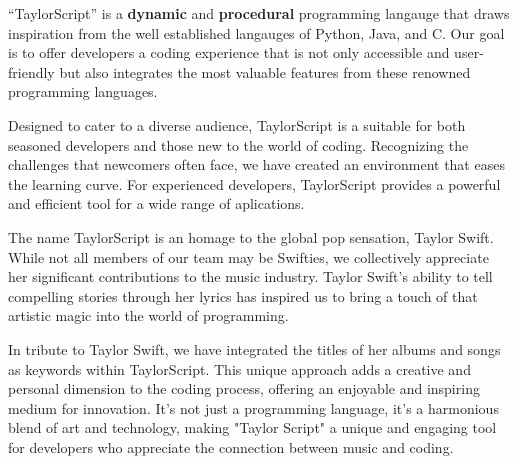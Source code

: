 ``TaylorScript'' is a \textbf{dynamic} and \textbf{procedural} programming langauge that draws inspiration from the well established langauges of Python, Java, and C. Our goal is to offer developers a coding experience that is not only accessible and user-friendly but also integrates the most valuable features from these renowned programming languages.

Designed to cater to a diverse audience, TaylorScript is a suitable for both seasoned developers and those new to the world of coding. Recognizing the challenges that newcomers often face, we have created an environment that eases the learning curve. For experienced developers, TaylorScript provides a powerful and efficient tool for a wide range of aplications.

The name TaylorScript is an homage to the global pop sensation, Taylor Swift. While not all members of our team may be Swifties, we collectively appreciate her significant contributions to the music industry. Taylor Swift's ability to tell compelling stories through her lyrics has inspired us to bring a touch of that artistic magic into the world of programming.

In tribute to Taylor Swift, we have integrated the titles of her albums and songs as keywords within TaylorScript. This unique approach adds a creative and personal dimension to the coding process, offering an enjoyable and inspiring medium for innovation. It's not just a programming language, it's a harmonious blend of art and technology, making "Taylor Script" a unique and engaging tool for developers who appreciate the connection between music and coding.
